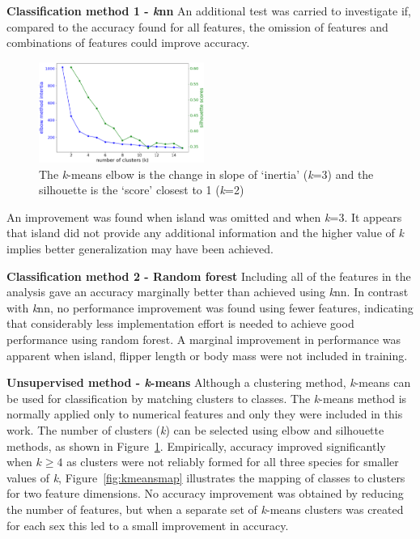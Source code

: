 \documentclass[12pt]{article}
\begin{document}
\textbf{Classification method 1 - \textit{k}nn}  
An additional test was carried to investigate if, compared to the accuracy found for all features, 
the omission of features and combinations of features could improve accuracy.
\begin{figure} %
  \centering
  \vspace{-0.5\baselineskip} %
  \includegraphics[width=0.48\textwidth]{kmeansvalue.png} %
  \vspace{-1.5\baselineskip} %
  \caption{\centering\linespread{0.8}\selectfont The \textit{k}-means elbow is the change in slope of `inertia' (\textit{k}=3)
  and the silhouette is the `score' closest to 1 (\textit{k}=2)}
  \vspace{-1\baselineskip} %
  \label{fig:kmeansvalue}
\end{figure}
An improvement was found when island was omitted and when \textit{k}=3. It appears that island did not provide 
any additional information and the higher value of \textit{k} implies better generalization may have been achieved.

\textbf{Classification method 2 - Random forest}  
Including all of the features in the analysis gave an accuracy marginally better 
than achieved using \textit{k}nn. 
In contrast with \textit{k}nn, no performance improvement was found using fewer features, indicating that 
considerably less implementation effort is needed to achieve good performance using random forest. 
A marginal improvement in performance was apparent when island, flipper length or body mass were not included in training.

\textbf{Unsupervised method - \textit{k}-means}  
Although a clustering method, 
\textit{k}-means can be used for classification by matching clusters to classes. 
The \textit{k}-means method is normally applied only to numerical features and only they were included in this work. 
The number of clusters (\textit{k}) can be selected using elbow and silhouette methods, 
as shown in Figure~\ref{fig:kmeansvalue}. Empirically, accuracy improved significantly when \(k \geq 4\)
as clusters were not reliably formed for all three species for smaller values of \textit{k},  
Figure~\ref{fig:kmeansmap} illustrates the mapping of classes to clusters for two feature dimensions. 
No accuracy improvement was obtained by reducing the number of features, 
but when a separate set of \textit{k}-means clusters was created for each sex 
this led to a small improvement in accuracy. 
\end{document}
